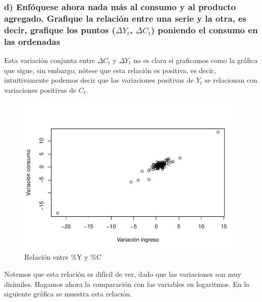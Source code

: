 \documentclass[
]{article}
\begin{document}
\hypertarget{d-enfuxf3quese-ahora-nada-muxe1s-al-consumo-y-al-producto-agregado.-grafique-la-relaciuxf3n-entre-una-serie-y-la-otra-es-decir-grafique-los-puntos-deltay_t-deltac_t-poniendo-el-consumo-en-las-ordenadas}{%
\subsubsection{\texorpdfstring{d) Enfóquese ahora nada más al consumo y
al producto agregado. Grafique la relación entre una serie y la otra, es
decir, grafique los puntos (\(\Delta{Y_t}\), \(\Delta{C_t}\)) poniendo
el consumo en las
ordenadas}{d) Enfóquese ahora nada más al consumo y al producto agregado. Grafique la relación entre una serie y la otra, es decir, grafique los puntos (\textbackslash Delta\{Y\_t\}, \textbackslash Delta\{C\_t\}) poniendo el consumo en las ordenadas}}\label{d-enfuxf3quese-ahora-nada-muxe1s-al-consumo-y-al-producto-agregado.-grafique-la-relaciuxf3n-entre-una-serie-y-la-otra-es-decir-grafique-los-puntos-deltay_t-deltac_t-poniendo-el-consumo-en-las-ordenadas}}

Esta variación conjunta entre \(\Delta{C_t}\) y \(\Delta{Y_t}\) no es
clara si graficamos como la gráfica que sigue, sin embargo, nótese que
esta relación es positiva, es decir, intuitivamente podemos decir que
las variaciones positivas de \(Y_t\) se relacionan con variaciones
positivas de \(C_t\).

\begin{figure}
\centering
\includegraphics{Ejercicio-3_files/figure-latex/unnamed-chunk-9-1.pdf}
\caption{Relación entre \%Y y \%C}
\end{figure}

Notemos que esta relación es difícil de ver, dado que las variaciones
son muy disímiles. Hagamos ahora la comparación con las variables en
logaritmos. En la siguiente gráfica se muestra esta relación.
\end{document}
